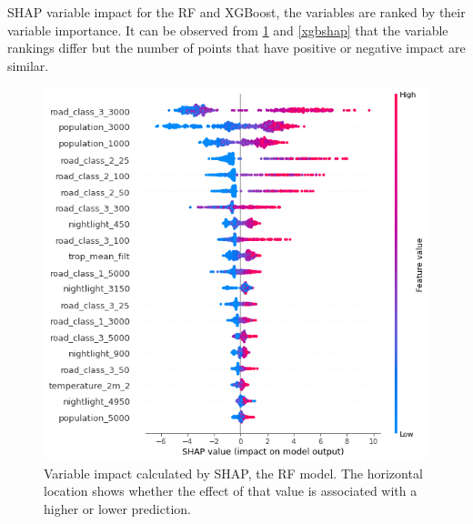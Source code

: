 \documentclass{article}
\begin{document}
SHAP variable impact for the RF and XGBoost, the variables are ranked by their variable importance. It can be observed from \cref{rfshap} and \cref{xgbshap} that the variable rankings differ but the number of points that have positive or negative impact are similar.  
\begin{figure}
\centering
\includegraphics[scale = 0.5]{fig/rfshap.png}
\caption{Variable impact calculated by SHAP, the RF model. The horizontal location shows whether the effect of that value is associated with a higher or lower prediction.}
\label{rfshap}
\end{figure}
\end{document}
